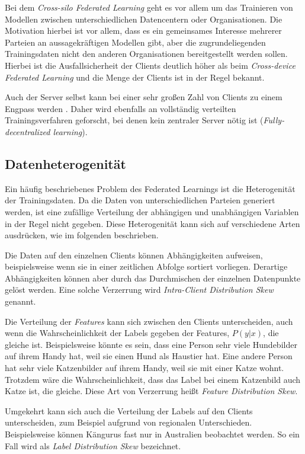 Bei dem \textit{Cross-silo Federated Learning} geht es vor allem um das Trainieren von Modellen zwischen unterschiedlichen Datencentern oder Organisationen. Die Motivation hierbei ist vor allem, dass es ein gemeinsames Interesse mehrerer Parteien an aussagekräftigen Modellen gibt, aber die zugrundeliegenden Trainingsdaten nicht den anderen Organisationen bereitgestellt werden sollen. Hierbei ist die Ausfallsicherheit der Clients deutlich höher als beim \textit{Cross-device Federated Learning} und die Menge der Clients ist in der Regel bekannt.

Auch der Server selbst kann bei einer sehr großen Zahl von Clients zu einem Engpass werden \cite[p.11]{kairouz:2021}. Daher wird ebenfalls an vollständig verteilten Trainingsverfahren geforscht, bei denen kein zentraler Server nötig ist (\textit{Fully-decentralized learning}).

\subsection{Datenheterogenität}\label{fund-fl-data-heterogenity}

Ein häufig beschriebenes Problem des Federated Learnings ist die Heterogenität der Trainingsdaten. Da die Daten von unterschiedlichen Parteien generiert werden, ist eine zufällige Verteilung der abhängigen und unabhängigen Variablen in der Regel nicht gegeben. Diese Heterogenität kann sich auf verschiedene Arten ausdrücken, wie im folgenden beschrieben.

Die Daten auf den einzelnen Clients können Abhängigkeiten aufweisen, beispielsweise wenn sie in einer zeitlichen Abfolge sortiert vorliegen. Derartige Abhängigkeiten können aber durch das Durchmischen der einzelnen Datenpunkte gelöst werden. Eine solche Verzerrung wird \textit{Intra-Client Distribution Skew} genannt.

Die Verteilung der \textit{Features} kann sich zwischen den Clients unterscheiden, auch wenn die Wahrscheinlichkeit der Labels gegeben der Features, $P(y|x)$, die gleiche ist. Beispielsweise könnte es sein, dass eine Person sehr viele Hundebilder auf ihrem Handy hat, weil sie einen Hund als Haustier hat. Eine andere Person hat sehr viele Katzenbilder auf ihrem Handy, weil sie mit einer Katze wohnt. Trotzdem wäre die Wahrscheinlichkeit, dass das Label bei einem Katzenbild auch Katze ist, die gleiche. Diese Art von Verzerrung heißt \textit{Feature Distribution Skew}.

Umgekehrt kann sich auch die Verteilung der Labels auf den Clients unterscheiden, zum Beispiel aufgrund von regionalen Unterschieden. Beispielsweise können Kängurus fast nur in Australien beobachtet werden. So ein Fall wird als \textit{Label Distribution Skew} bezeichnet.

